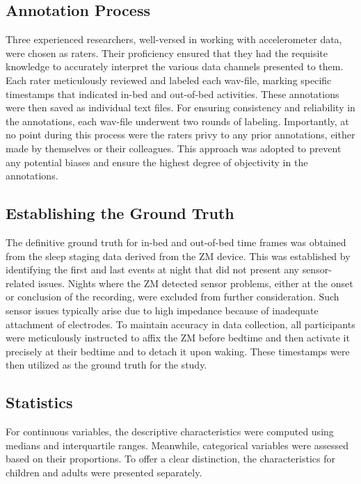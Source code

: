 \documentclass[
  10pt,
]{scrbook}
\begin{document}
\hypertarget{annotation-process}{%
\subsection{Annotation Process}\label{annotation-process}}

Three experienced researchers, well-versed in working with accelerometer
data, were chosen as raters. Their proficiency ensured that they had the
requisite knowledge to accurately interpret the various data channels
presented to them. Each rater meticulously reviewed and labeled each
wav-file, marking specific timestamps that indicated in-bed and
out-of-bed activities. These annotations were then saved as individual
text files. For ensuring consistency and reliability in the annotations,
each wav-file underwent two rounds of labeling. Importantly, at no point
during this process were the raters privy to any prior annotations,
either made by themselves or their colleagues. This approach was adopted
to prevent any potential biases and ensure the highest degree of
objectivity in the annotations.

\hypertarget{establishing-the-ground-truth}{%
\subsection{Establishing the Ground
Truth}\label{establishing-the-ground-truth}}

The definitive ground truth for in-bed and out-of-bed time frames was
obtained from the sleep staging data derived from the ZM device. This
was established by identifying the first and last events at night that
did not present any sensor-related issues. Nights where the ZM detected
sensor problems, either at the onset or conclusion of the recording,
were excluded from further consideration. Such sensor issues typically
arise due to high impedance because of inadequate attachment of
electrodes. To maintain accuracy in data collection, all participants
were meticulously instructed to affix the ZM before bedtime and then
activate it precisely at their bedtime and to detach it upon waking.
These timestamps were then utilized as the ground truth for the study.

\hypertarget{statistics}{%
\subsection{Statistics}\label{statistics}}

For continuous variables, the descriptive characteristics were computed
using medians and interquartile ranges. Meanwhile, categorical variables
were assessed based on their proportions. To offer a clear distinction,
the characteristics for children and adults were presented separately.
\end{document}
